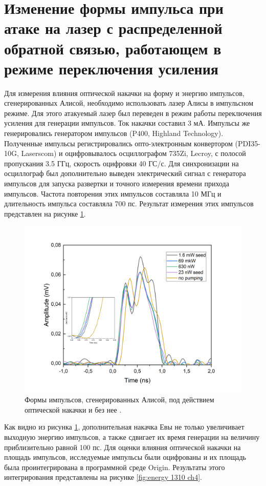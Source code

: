 \section{Изменение формы импульса при атаке на лазер с распределенной обратной связью, работающем в режиме переключения усиления}\label{sec:ch4/sect4} 
Для измерения влияния оптической накачки на форму и энергию импульсов, сгенерированных Алисой, необходимо использовать лазер Алисы в импульсном режиме. Для этого атакуемый лазер был переведен в режим работы переключения усиления для генерации импульсов. Ток накачки составил 3 мА. Импульсы же генерировались генератором импульсов (P400, Highland Technology). Полученные импульсы регистрировались опто-электронным конвертором (PDI35-10G, Laserscom) и оцифровывалось осциллографом 735Zi, Lecroy, с полосой пропускания 3.5 ГГц, скорость оцифровки 40 ГС/с. Для синхронизации на осциллограф был дополнительно выведен электрический сигнал с генератора импульсов для запуска развертки и точного измерения времени прихода импульсов. Частота повторения этих импульсов составляла 10 МГц и длительность импульса составляла 700 пс. Результат измерения этих импульсов представлен на рисунке \ref{fig:pulse shape ch4}.
\begin{figure}
    \centering
    \includegraphics[width=\linewidth]{images/Импульсы под действием 1310 для диссера.png}
    \caption{Формы импульсов, сгенерированных Алисой, под действием оптической накачки и без нее \cite{fadeev2025}.}
    \label{fig:pulse shape ch4}
\end{figure}
Как видно из рисунка \ref{fig:pulse shape ch4}, дополнительная накачка Евы не только увеличивает выходную энергию импульсов, а также сдвигает их время генерации на величину приблизительно равной 100 пс. Для оценки влияния оптической накачки на площадь импульсов, исследуемые импульсы были оцифрованы и их площадь была проинтегрирована в программной среде Origin. Результаты этого интегрирования представлены на рисунке \ref{fig:energy 1310 ch4}.
